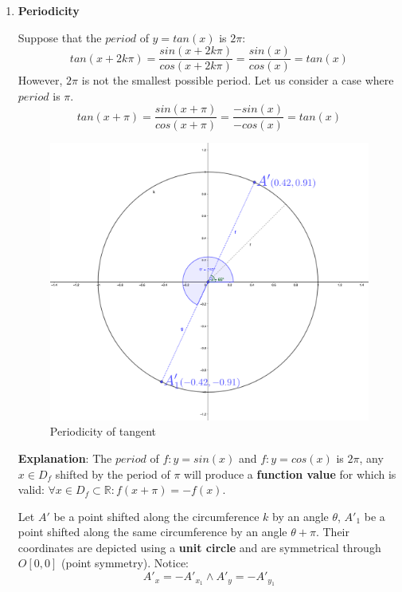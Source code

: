 \documentclass{article}
\begin{document}
\begin{enumerate}
    \item \textbf{Periodicity}
    
    Suppose that the $period$ of $y=tan(x)$ is $2\pi$: 
    \[
    tan(x + 2k\pi) = \frac{sin(x + 2k\pi)}{cos(x + 2k\pi)} = \frac{sin(x)}{cos(x)} = tan(x)
    \]
    However, $2\pi$ is not the smallest possible period. Let us consider a case where $period$ is $\pi$.
    \[
    tan(x + \pi) = \frac{sin(x +\pi)}{cos(x + \pi)} = \frac{-sin(x)}{-cos(x)} = tan(x)
    \]
    
    \begin{figure}[ht!]
        \centering
        \vspace{-10pt}
        \centering\includegraphics[scale=2.5]{unit_circle_tangent_proof.png}
        \vspace{-10pt}
        \caption{Periodicity of tangent}
        \vspace{-10pt}
    \end{figure}
    
    \textbf{Explanation}: The $period$ of $f:y=sin(x)$ and $f:y=cos(x)$ is $2\pi$, any $x \in D_f$ shifted by the period of $\pi$ will produce a \textbf{function value} for which is valid: $\forall x \in D_f \subset \mathbb{R}: f(x + \pi)=-f(x)$.
    
    Let $A'$ be a point shifted along the circumference $k$ by an angle $\theta$, $A'_1$ be a point shifted along the same circumference by an angle $\theta + \pi$. Their coordinates are depicted using a \textbf{unit circle} and are symmetrical through $O[0,0]$ (point symmetry). Notice: 
    \[
    A'_x = -A'_{x_1} \land A'_y = -A'_{y_1} 
    \]
    

\end{enumerate}
\end{document}
